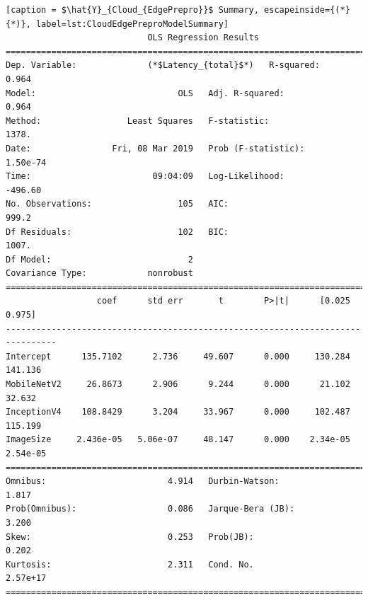 \begin{minipage}{\linewidth}
\begin{lstlisting}[caption = $\hat{Y}_{Cloud_{EdgePrepro}}$ Summary, escapeinside={(*}{*)}, label=lst:CloudEdgePreproModelSummary]
                            OLS Regression Results                            
==============================================================================
Dep. Variable:              (*$Latency_{total}$*)   R-squared:                       0.964
Model:                            OLS   Adj. R-squared:                  0.964
Method:                 Least Squares   F-statistic:                     1378.
Date:                Fri, 08 Mar 2019   Prob (F-statistic):           1.50e-74
Time:                        09:04:09   Log-Likelihood:                -496.60
No. Observations:                 105   AIC:                             999.2
Df Residuals:                     102   BIC:                             1007.
Df Model:                           2                                         
Covariance Type:            nonrobust                                         
================================================================================
                  coef      std err       t        P>|t|      [0.025      0.975]
--------------------------------------------------------------------------------
Intercept      135.7102      2.736     49.607      0.000     130.284     141.136
MobileNetV2     26.8673      2.906      9.244      0.000      21.102      32.632
InceptionV4    108.8429      3.204     33.967      0.000     102.487     115.199
ImageSize     2.436e-05   5.06e-07     48.147      0.000    2.34e-05    2.54e-05
==============================================================================
Omnibus:                        4.914   Durbin-Watson:                   1.817
Prob(Omnibus):                  0.086   Jarque-Bera (JB):                3.200
Skew:                           0.253   Prob(JB):                        0.202
Kurtosis:                       2.311   Cond. No.                     2.57e+17
==============================================================================
\end{lstlisting}
\end{minipage}

